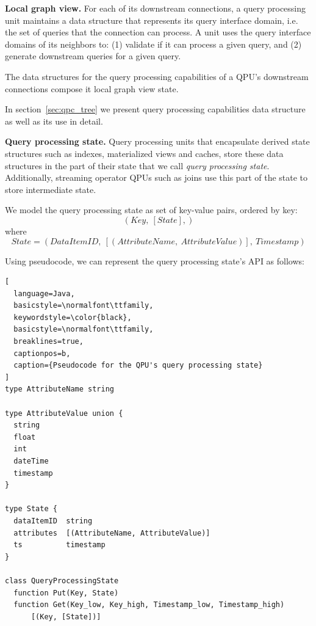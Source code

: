 \medskip
\noindent
\textbf{Local graph view.}
For each of its downstream connections, a query processing unit maintains a data structure that represents
its query interface domain, i.e. the set of queries that the connection can process.
A unit uses the query interface domains of its neighbors to:
(1) validate if it can process a given query, and
(2) generate downstream queries for a given query.

The data structures for the query processing capabilities of a QPU's downstream connections compose it local graph view
state.

In section~\ref{sec:qpc_tree} we present query processing capabilities data structure as well as its use in detail.

\medskip
\noindent
\textbf{Query processing state.}
Query processing units that encapsulate derived state structures such as indexes, materialized views and
caches, store these data structures in the part of their state that we call \textit{query processing state}.
Additionally, streaming operator QPUs such as joins use this part of the state to store intermediate state.

We model the query processing state as set of key-value pairs, ordered by key:
\[
  (Key,~[State],)
\]
where
\[
  State = (DataItemID,~[(AttributeName,~AttributeValue)],~Timestamp)
\]


Using pseudocode, we can represent the query processing state's API as follows:

\begin{lstlisting}[
  language=Java,
  basicstyle=\normalfont\ttfamily,
  keywordstyle=\color{black},
  basicstyle=\normalfont\ttfamily,
  breaklines=true,
  captionpos=b,
  caption={Pseudocode for the QPU's query processing state}
]
type AttributeName string

type AttributeValue union {
  string
  float
  int
  dateTime
  timestamp
}

type State {
  dataItemID  string
  attributes  [(AttributeName, AttributeValue)]
  ts          timestamp
}

class QueryProcessingState
  function Put(Key, State)
  function Get(Key_low, Key_high, Timestamp_low, Timestamp_high)
      [(Key, [State])]
\end{lstlisting}

